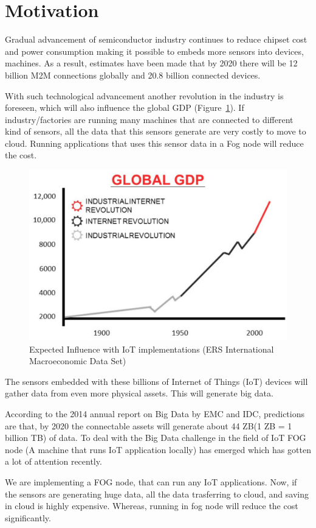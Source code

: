 \section{Motivation}
Gradual advancement of semiconductor industry continues to reduce chipset cost and power consumption making it possible to embeds more sensors into devices, machines. As a result, estimates have been made that by 2020 there will be 12 billion \ac{M2M} connections globally \cite{machinareport} and 20.8 billion connected devices.\cite{Gartner} 

With such technological advancement another revolution in the industry is foreseen,
which will also influence the global GDP (Figure~\ref{img:gdp}). If industry/factories are running many machines that are connected to different kind of sensors, all the data that this sensors generate are very costly to move to cloud. Running applications that uses this sensor data in a Fog node will reduce the cost.

\begin{figure}[H]
  \centering
  \includegraphics[width=.55\textwidth]{img/gdp}
  \caption{Expected Influence with IoT implementations (ERS International Macroeconomic Data Set)}\label{img:gdp}
\end{figure}

The sensors embedded with these billions of Internet of Things (IoT) \cite{Alberti2013} devices will gather data from even
more physical assets. This will generate big data.

According to the 2014 annual report on Big Data by EMC and IDC, predictions
are that, by 2020 the connectable assets will generate about 44 ZB(1 ZB = 1 billion TB) of data. To deal with the Big
Data challenge in the field of IoT FOG node (A machine that runs IoT application locally) has emerged which has gotten a lot of attention recently.

We are implementing a FOG node, that can run any IoT applications. Now, if the sensors are generating huge data, all the data trasferring to cloud, and saving in cloud is highly expensive. Whereas, running in fog node will reduce the cost significantly. 